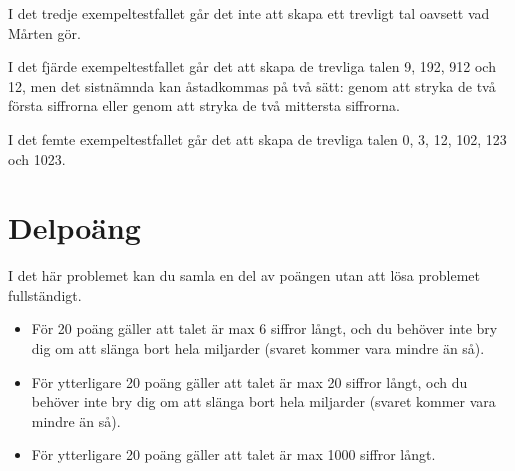 I det tredje exempeltestfallet går det inte att skapa ett trevligt tal oavsett
vad Mårten gör.

I det fjärde exempeltestfallet går det att skapa de trevliga talen 9, 192, 912 och 12, men det sistnämnda kan åstadkommas på två sätt: genom att stryka de två första siffrorna eller genom att stryka de två mittersta siffrorna.

I det femte  exempeltestfallet går det att skapa de trevliga talen 0, 3, 12, 102, 123 och 1023.

\section*{Delpoäng}
I det här problemet kan du samla en del av poängen utan att lösa problemet
fullständigt.
\begin{itemize}
    \item För 20 poäng gäller att talet är max 6 siffror långt, och du behöver
        inte bry dig om att slänga bort hela miljarder (svaret kommer
        vara mindre än så).
    \item För ytterligare 20 poäng gäller att talet är max 20 siffror långt,
        och du behöver inte bry dig om att slänga bort hela miljarder
        (svaret kommer vara mindre än så).
    \item För ytterligare 20 poäng gäller att talet är max 1000 siffror långt.
\end{itemize}
